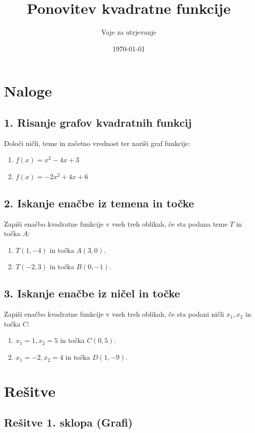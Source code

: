 \documentclass[a4paper,12pt]{article}
\title{Ponovitev kvadratne funkcije}
\author{Vaje za utrjevanje}
\date{\today}
\begin{document}
\maketitle

\section{Naloge}

\subsection*{1. Risanje grafov kvadratnih funkcij}
Določi ničli, teme in začetno vrednost ter nariši graf funkcije:
\begin{enumerate}
    \item $f(x) = x^2 - 4x + 3$
    \item $f(x) = -2x^2 + 4x + 6$
\end{enumerate}

\subsection*{2. Iskanje enačbe iz temena in točke}
Zapiši enačbo kvadratne funkcije v vseh treh oblikah, če sta podana teme $T$ in točka $A$:
\begin{enumerate}
    \item $T(1, -4)$ in točka $A(3, 0)$.
    \item $T(-2, 3)$ in točka $B(0, -1)$.
\end{enumerate}

\subsection*{3. Iskanje enačbe iz ničel in točke}
Zapiši enačbo kvadratne funkcije v vseh treh oblikah, če sta podani ničli $x_1, x_2$ in točka $C$:
\begin{enumerate}
    \item $x_1 = 1, x_2 = 5$ in točka $C(0, 5)$.
    \item $x_1 = -2, x_2 = 4$ in točka $D(1, -9)$.
\end{enumerate}

\newpage

\section{Rešitve}

\subsection*{Rešitve 1. sklopa (Grafi)}
\end{document}
